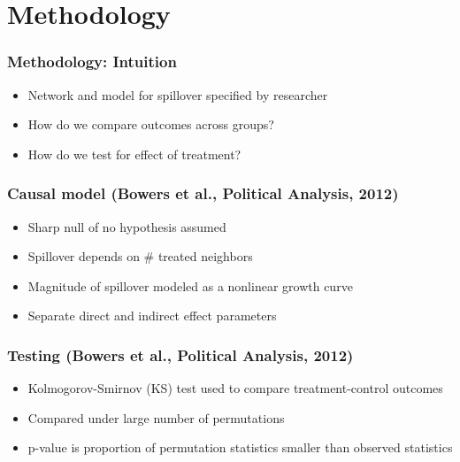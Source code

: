 \documentclass{beamer}
\begin{document}
\section{Methodology}

\begin{frame}
\frametitle{Methodology: Intuition}
\begin{itemize}
\item {\LARGE Network and model for spillover specified by researcher}
\vspace{5mm}
\item {\LARGE How do we compare outcomes across groups?}
\vspace{5mm}
\item {\LARGE How do we test for effect of treatment?}
\end{itemize}
\end{frame}


\begin{frame}
\frametitle{Causal model (Bowers et al., Political Analysis, 2012)}
\begin{itemize}
\item {\LARGE Sharp null of no hypothesis assumed}
\vspace{5mm}
\item {\LARGE Spillover depends on \# treated neighbors}
\vspace{5mm}
\item {\LARGE Magnitude of spillover modeled as a nonlinear growth curve}
\vspace{5mm}
\item {\LARGE Separate direct and indirect effect parameters}
\end{itemize}
\end{frame}


\begin{frame}
\frametitle{Testing (Bowers et al., Political Analysis, 2012)}
\begin{itemize}
\item {\LARGE Kolmogorov-Smirnov (KS) test used to compare treatment-control outcomes}
\vspace{5mm}
\item {\LARGE Compared under large number of permutations}
\vspace{5mm}
\item {\LARGE p-value is proportion of permutation statistics smaller than observed statistics}
\end{itemize}
\end{frame}
\end{document}

